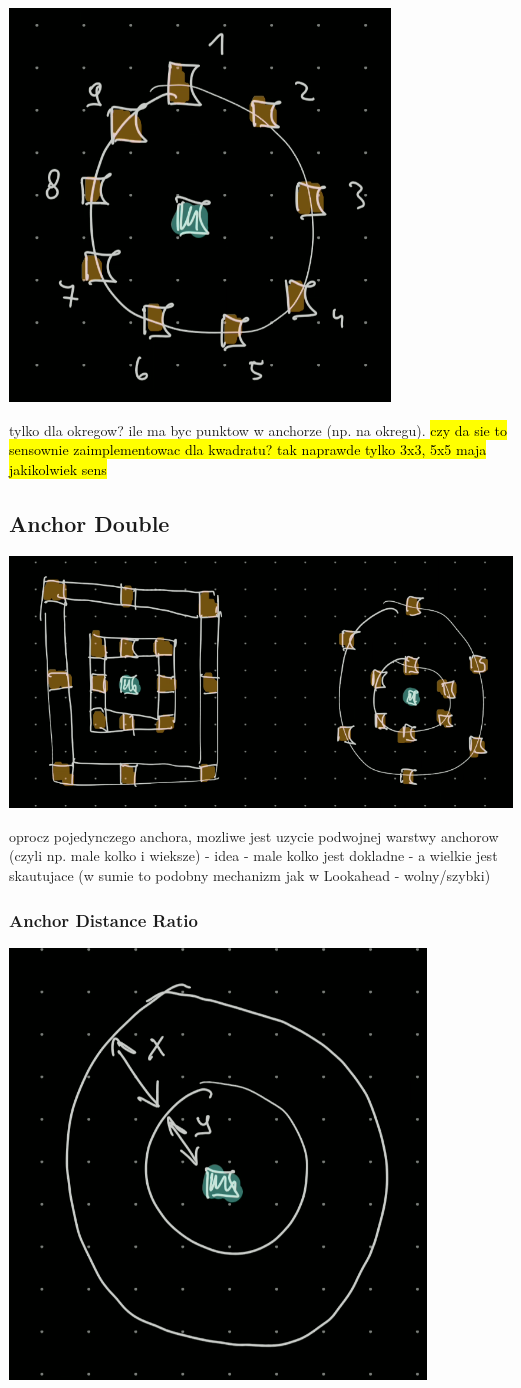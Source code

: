 \documentclass{article}
\begin{document}
\includegraphics[width=0.5\linewidth]{../figures/idea_anchor_num}

tylko dla okregow?
ile ma byc punktow w anchorze (np. na okregu).
\hl{czy da sie to sensownie zaimplementowac dla kwadratu? tak naprawde tylko
3x3, 5x5 maja jakikolwiek sens}

\subsection{Anchor Double} %

\includegraphics[width=0.5\linewidth]{../figures/idea_anchor_double}

oprocz pojedynczego anchora, mozliwe jest uzycie podwojnej warstwy anchorow
(czyli np. male kolko i wieksze) - idea - male kolko jest dokladne - a wielkie
jest skautujace (w sumie to podobny mechanizm jak w Lookahead - wolny/szybki)

\subsubsection{Anchor Distance Ratio}

\includegraphics[width=0.5\linewidth]{../figures/idea_anchor_distance_ratio}
\end{document}
